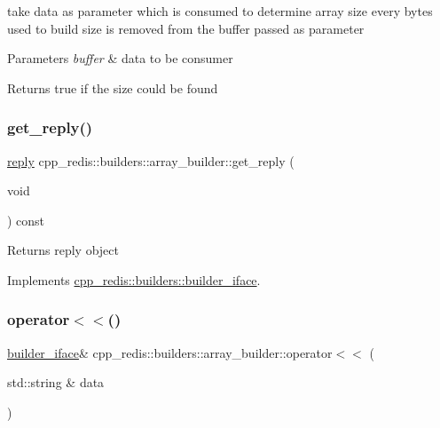 take data as parameter which is consumed to determine array size every bytes used to build size is removed from the buffer passed as parameter


\begin{DoxyParams}{Parameters}
{\em buffer} & data to be consumer \\
\hline
\end{DoxyParams}
\begin{DoxyReturn}{Returns}
true if the size could be found 
\end{DoxyReturn}
\mbox{\label{classcpp__redis_1_1builders_1_1array__builder_ac5c805ad87b357a9578c5a0d479109b3}} 
\subsubsection{\texorpdfstring{get\+\_\+reply()}{get\_reply()}}
{\footnotesize\ttfamily \hyperlink{classcpp__redis_1_1reply}{reply} cpp\+\_\+redis\+::builders\+::array\+\_\+builder\+::get\+\_\+reply (\begin{DoxyParamCaption}\item[{void}]{ }\end{DoxyParamCaption}) const\hspace{0.3cm}{\ttfamily [virtual]}}

\begin{DoxyReturn}{Returns}
reply object 
\end{DoxyReturn}


Implements \hyperlink{classcpp__redis_1_1builders_1_1builder__iface_afd2ff2c2371c2a486116543b638b9413}{cpp\+\_\+redis\+::builders\+::builder\+\_\+iface}.

\mbox{\label{classcpp__redis_1_1builders_1_1array__builder_a043357d0ef70406adef4df78c8d5307f}} 
\subsubsection{\texorpdfstring{operator$<$$<$()}{operator<<()}}
{\footnotesize\ttfamily \hyperlink{classcpp__redis_1_1builders_1_1builder__iface}{builder\+\_\+iface}\& cpp\+\_\+redis\+::builders\+::array\+\_\+builder\+::operator$<$$<$ (\begin{DoxyParamCaption}\item[{std\+::string \&}]{data }\end{DoxyParamCaption})\hspace{0.3cm}{\ttfamily [virtual]}}

